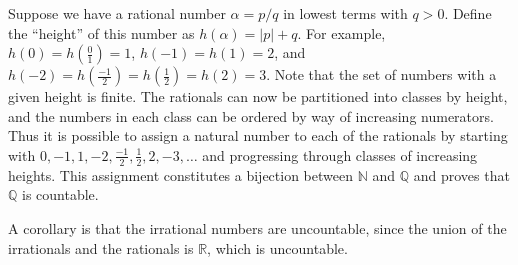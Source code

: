 \documentclass[12pt]{article}
\begin{document}
Suppose we have a rational number $\alpha = p/q$ in lowest terms with $q>0$. Define the ``height'' of this number as $h(\alpha) = |p| + q$. For example, $h(0) = h(\frac{0}{1}) = 1$, $h(-1) = h(1) = 2$, and $h(-2) = h(\frac{-1}{2}) = h(\frac{1}{2}) = h(2) = 3.$ Note that the set of numbers with a given height is finite. The rationals can now be partitioned into classes by height, and the numbers in each class can be ordered by way of increasing numerators. Thus it is possible to assign a natural number to each of the rationals by starting with $0, -1, 1, -2, \frac{-1}{2}, \frac{1}{2}, 2, -3, \ldots$ and progressing through classes of increasing heights. This assignment constitutes a bijection between $\mathbb{N}$ and $\mathbb{Q}$ and proves that $\mathbb{Q}$ is countable.

A corollary is that the irrational numbers are uncountable, since the union of the irrationals and the rationals is $\mathbb{R}$, which is uncountable.
\end{document}
